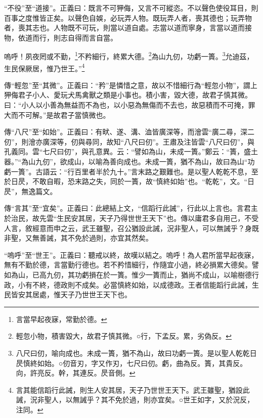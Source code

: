 {\noindent\shu{}\fzkt “不役”至“道接”。正義曰：既言不可狎侮，又言不可縱恣。不以聲色使役耳目，則百事之度惟皆正矣。以聲色自娛，必玩弄人物。既玩弄人者，喪其德也；玩弄物者，喪其志也。人物既不可玩，則當以道自處。志當以道而寧身，言當以道而接物，依道而行，則志自得而言自當。 \par}

嗚呼！夙夜罔或不勤，\footnote{言當早起夜寐，常勤於德。}不矜細行，終累大德。\footnote{輕忽小物，積害毀大，故君子慎其微。○行，下孟反。累，劣偽反。}為山九仞，功虧一簣。\footnote{八尺曰仞，喻向成也。未成一簣，猶不為山，故曰功虧一簣。是以聖人乾乾日昃慎終如始。○仞音刃，字又作刃，七尺曰仞。虧，曲為反。簣，其貴反。向，許亮反。幹，其連反。昃音側。}允迪茲，生民保厥居，惟乃世王。”\footnote{言其能信蹈行此誡，則生人安其居，天子乃世世王天下。武王雖聖，猶設此誡，況非聖人，以無誡乎？其不免於過，則亦宜矣。○世王如字，又於況反，注同。}


{\noindent\zhuan{}\fzbyks 傳“輕忽”至“其微”。正義曰：“矜”是憐惜之意，故以不惜細行為“輕忽小物”，謂上狎侮君子小人、愛玩犬馬禽獸之類是小事也。積小害，毀大德，故君子慎其微。曰：“小人以小善為無益而不為也，以小惡為無傷而不去也，故惡積而不可掩，罪大而不可解。”是故君子當慎微也。 \par}

{\noindent\zhuan{}\fzbyks 傳“八尺”至“如始”。正義曰：有畎、遂、溝、洫皆廣深等，而澮雲“廣二尋，深二仞”，則澮亦廣深等，仞與尋同，故知“八尺曰仞”。王肅及注皆雲“八尺曰仞”，與孔義同。雲“七尺曰仞”，與孔意異。云：“譬如為山，未成一簣。”鄭云：“簣，盛土器。”“為山九仞”，欲成山，以喻為善向成也。未成一簣，猶不為山，故曰為山“功虧一簣”。古語云：“行百里者半於九十。”言末路之艱難也。是以聖人乾乾不息，至於日昃，不敢自暇，恐末路之失，同於一簣，故“慎終如始”也。“乾乾”，文。“日昃”，無逸篇文。 \par}

{\noindent\zhuan{}\fzbyks 傳“言其”至“宜矣”。正義曰：此總結上文，“信蹈行此誡”，行此以上言也。言君主於治民，故先雲“生民安其居，天子乃得世世王天下”也。傳以庸君多自用己，不受人言，敘經意而申之云，武王雖聖，召公猶設此誡，況非聖人，可以無誡乎？身既非聖，又無善誡，其不免於過則，亦宜其然矣。 \par}

{\noindent\shu{}\fzkt “嗚呼”至“世王”。正義曰：聽戒以終，故嘆以結之。嗚呼！為人君所當早起夜寐，無有不勤於德，言當勤行德也。若不矜惜細行，作隨宜小過，終必損累大德矣。譬如為山，已高九仞，其功虧損在於一簣。惟少一簣而止，猶尚不成山，以喻樹德行政，小有不終，德政則不成矣。必當慎終如始，以成德政。王者信能蹈行此誡，生民皆安其居處，惟天子乃世世王天下也。 \par}


